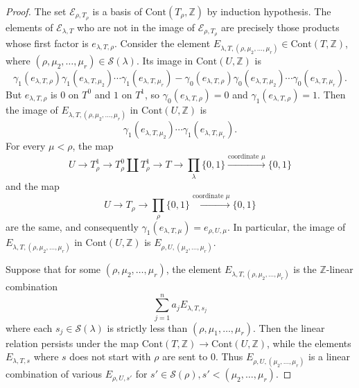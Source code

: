 \begin{proof}
The set $ \mathscr{E}_{\rho, T _{\rho}} $ is a basis of $ \mathrm{Cont}(T _{\rho}, \mathbb{Z}) $ by induction hypothesis.
The elements of $ \mathscr{E}_{\lambda, T} $ who are not in the image of $ \mathscr{E}_{\rho, T _{\rho}} $
are precisely those products whose first factor is $ e _{\lambda, T, \rho} $.
Consider the element $ E _{\lambda, T, (\rho, \mu _{2}, \ldots, \mu _{r})} \in \mathrm{Cont}(T, \mathbb{Z})$,
where $ (\rho, \mu _{2}, \ldots, \mu _{r})\in \mathcal{S}(\lambda) $.
Its image in $ \mathrm{Cont}(U, \mathbb{Z}) $ is
\begin{equation*}
\gamma _{1}(e _{\lambda, T, \rho})\gamma _{1}(e _{\lambda, T, \mu _{2}})\cdots \gamma _{1}(e _{\lambda, T, \mu _{r}})
- \gamma _{0}(e _{\lambda, T, \rho})\gamma _{0}(e _{\lambda, T, \mu _{2}})\cdots \gamma _{0}(e _{\lambda, T, \mu _{r}}).
\end{equation*}
But $ e _{\lambda, T, \rho} $ is $ 0 $ on $ T ^{0} $ and $ 1 $ on $ T ^{1} $,
so $ \gamma _{0}(e _{\lambda, T, \rho}) = 0 $ and $ \gamma _{1}(e _{\lambda, T, \rho}) = 1 $.
Then the image of $ E _{\lambda, T, (\rho, \mu _{2}, \ldots, \mu _{r})} $ in $ \mathrm{Cont}(U, \mathbb{Z}) $ is
\begin{equation*}
\gamma _{1}(e _{\lambda, T, \mu _{2}})\cdots \gamma _{1}(e _{\lambda, T, \mu _{r}}).
\end{equation*}
For every $ \mu< \rho $, the map 
\begin{equation*}
U\to T ^{1}_{\rho}\to T ^{0}_{\rho}\coprod T ^{1}_{\rho}\to T \to \prod _{\lambda} \{0, 1\}\xrightarrow{\text{coordinate }\mu} \{0, 1\}
\end{equation*}
and the map
\begin{equation*}
U\to T _{\rho} \to \prod _{\rho} \{0, 1\}\xrightarrow{\text{coordinate }\mu} \{0, 1\}
\end{equation*}
are the same,
and consequently $ \gamma _{1}(e _{\lambda, T, \mu}) = e _{\rho, U, \mu} $.
In particular, the image of $ E _{\lambda, T, (\rho, \mu _{2}, \ldots, \mu _{r})} $
in $ \mathrm{Cont}(U, \mathbb{Z}) $ is $ E _{\rho, U, (\mu _{2}, \ldots, \mu _{r})} $.

Suppose that for some $ (\rho, \mu _{2}, \ldots, \mu _{r}) $, the element 
$ E _{\lambda, T, (\rho, \mu _{2}, \ldots, \mu _{r})} $ is the $ \mathbb{Z} $-linear combination
\begin{equation*}
\sum _{j=1}^{n} a _{j} E _{\lambda, T, s _{j}}
\end{equation*}
where each $ s _{j} \in \mathscr{S}(\lambda) $ is strictly less than $ (\rho, \mu _{1}, \ldots, \mu _{r}) $.
Then the linear relation persists under the map $ \mathrm{Cont}(T, \mathbb{Z})\to \mathrm{Cont}(U, \mathbb{Z}) $, while
the elements $ E _{\lambda, T, s} $ where $ s $ does not start with $ \rho $ are sent to $ 0 $.
Thus $ E _{\rho, U, (\mu _{2}, \ldots, \mu _{r})} $ is a linear combination of various $ E _{\rho, U, s'} $
for $ s'\in \mathcal{S}(\rho), s' < (\mu _{2}, \ldots, \mu _{r}) $.


\end{proof}
